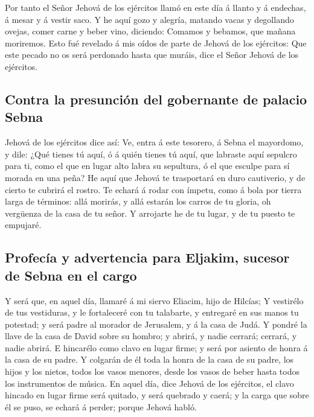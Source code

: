  Por tanto el Señor Jehová de los ejércitos llamó en este
día á llanto y á endechas, á mesar y á vestir saco.  Y he
aquí gozo y alegría, matando vacas y degollando ovejas, comer carne y
beber vino, diciendo: Comamos y bebamos, que mañana moriremos.
 Esto fué revelado á mis oídos de parte de Jehová de los
ejércitos: Que este pecado no os será perdonado hasta que muráis, dice
el Señor Jehová de los ejércitos.

\hypertarget{contra-la-presunciuxf3n-del-gobernante-de-palacio-sebna}{%
\subsection{Contra la presunción del gobernante de palacio
Sebna}\label{contra-la-presunciuxf3n-del-gobernante-de-palacio-sebna}}

 Jehová de los ejércitos dice así: Ve, entra á este
tesorero, á Sebna el mayordomo, y dile:  ¿Qué tienes tú
aquí, ó á quién tienes tú aquí, que labraste aquí sepulcro para ti, como
el que en lugar alto labra su sepultura, ó el que esculpe para sí morada
en una peña?  He aquí que Jehová te trasportará en duro
cautiverio, y de cierto te cubrirá el rostro.  Te echará á
rodar con ímpetu, como á bola por tierra larga de términos: allá
morirás, y allá estarán los carros de tu gloria, oh vergüenza de la casa
de tu señor.  Y arrojarte he de tu lugar, y de tu puesto te
empujaré.

\hypertarget{profecuxeda-y-advertencia-para-eljakim-sucesor-de-sebna-en-el-cargo}{%
\subsection{Profecía y advertencia para Eljakim, sucesor de Sebna en el
cargo}\label{profecuxeda-y-advertencia-para-eljakim-sucesor-de-sebna-en-el-cargo}}

 Y será que, en aquel día, llamaré á mi siervo Eliacim,
hijo de Hilcías;  Y vestirélo de tus vestiduras, y le
fortaleceré con tu talabarte, y entregaré en sus manos tu potestad; y
será padre al morador de Jerusalem, y á la casa de Judá.  Y
pondré la llave de la casa de David sobre su hombro; y abrirá, y nadie
cerrará; cerrará, y nadie abrirá.  E hincarélo como clavo
en lugar firme; y será por asiento de honra á la casa de su padre.
 Y colgarán de él toda la honra de la casa de su padre, los
hijos y los nietos, todos los vasos menores, desde los vasos de beber
hasta todos los instrumentos de música.  En aquel día, dice
Jehová de los ejércitos, el clavo hincado en lugar firme será quitado, y
será quebrado y caerá; y la carga que sobre él se puso, se echará á
perder; porque Jehová habló.

